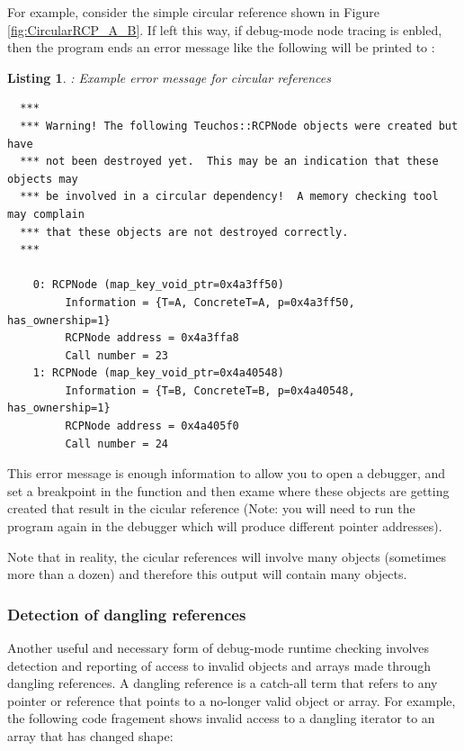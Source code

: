\documentclass[pdf,ps2pdf,11pt]{SANDreport}
\newtheorem{listing}{Listing}
\begin{document}
For example, consider the simple circular reference shown in Figure
{}\ref{fig:CircularRCP_A_B}.  If left this way, if debug-mode node
tracing is enbled, then the program ends an error message like the
following will be printed to {}:

\begin{listing}: Example error message for circular references \\
\label{listing:curcular-ref-error-msg}
{\small\begin{verbatim}
  ***
  *** Warning! The following Teuchos::RCPNode objects were created but have
  *** not been destroyed yet.  This may be an indication that these objects may
  *** be involved in a circular dependency!  A memory checking tool may complain
  *** that these objects are not destroyed correctly.
  ***
  
    0: RCPNode (map_key_void_ptr=0x4a3ff50)
         Information = {T=A, ConcreteT=A, p=0x4a3ff50, has_ownership=1}
         RCPNode address = 0x4a3ffa8
         Call number = 23
    1: RCPNode (map_key_void_ptr=0x4a40548)
         Information = {T=B, ConcreteT=B, p=0x4a40548, has_ownership=1}
         RCPNode address = 0x4a405f0
         Call number = 24
\end{verbatim}}
\end{listing}

This error message is enough information to allow you to open a
debugger, and set a breakpoint in the function
{} and then exame where
these objects are getting created that result in the cicular reference
(Note: you will need to run the program again in the debugger which
will produce different pointer addresses).

Note that in reality, the cicular references will involve many objects
(sometimes more than a dozen) and therefore this output will contain
many {} objects.


%
{}\subsubsection{Detection of dangling references}
\label{sec:detection-dangling-references}
%

Another useful and necessary form of debug-mode runtime checking
involves detection and reporting of access to invalid objects and
arrays made through dangling references.  A dangling reference is a
catch-all term that refers to any pointer or reference that points to
a no-longer valid object or array.  For example, the following code
fragement shows invalid access to a dangling iterator to an array that
has changed shape:
\end{document}

